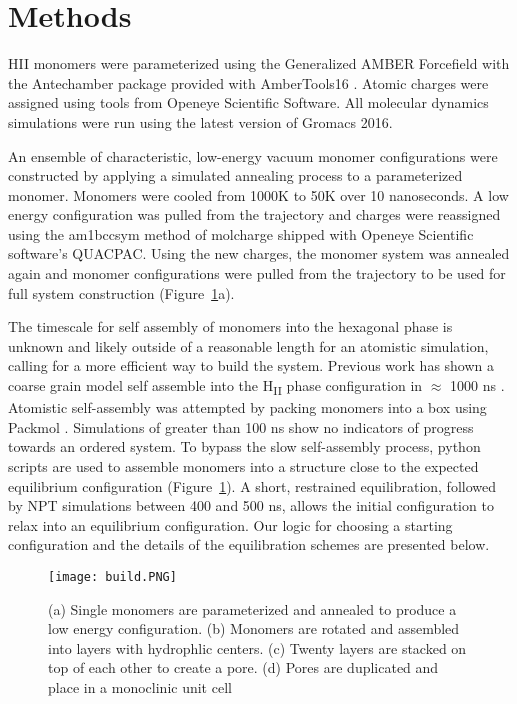 \section*{Methods}
	
HII monomers were parameterized using the Generalized AMBER Forcefield
\cite{wang_development_2004} with the Antechamber package \cite{wang_automatic_2006}
provided with AmberTools16 \cite{case_ambertools16_2016}. Atomic charges were
assigned using tools from Openeye Scientific Software. All molecular 
dynamics simulations were run using the latest version of Gromacs 2016. \cite{bekker_gromacs:_1993,berendsen_gromacs:_1995,
van_der_spoel_gromacs:_2005,hess_gromacs_2008}
	
An ensemble of characteristic, low-energy vacuum monomer configurations
were constructed by applying a simulated annealing process to a
parameterized monomer. Monomers were cooled from 1000K to 50K over 10
nanoseconds. A low energy configuration was pulled from the trajectory 
and charges were reassigned using the am1bccsym method of molcharge
shipped with Openeye Scientific software's QUACPAC. Using the new
charges, the monomer system was annealed again and monomer
configurations were pulled from the trajectory to be used for full
system construction (Figure~\ref{fig:python}a).
	
The timescale for self assembly of monomers into the hexagonal phase is
unknown and likely outside of a reasonable length for an atomistic
simulation, calling for a more efficient way to build the system. 
Previous work has shown a coarse grain model self assemble into the H\textsubscript{II}
phase configuration in $\approx$ 1000 ns \cite{mondal_self-assembly_2013}.
Atomistic self-assembly was attempted by packing monomers into a box 
using Packmol \cite{martinez_packmol:_2009}. Simulations of greater than 100 ns 
show no indicators of progress towards an ordered system. To bypass the
slow self-assembly process, python scripts are used to assemble 
monomers into a structure close to the expected equilibrium configuration (Figure~\ref{fig:python}).
A short, restrained equilibration, followed by NPT simulations between 400 and 500 ns, 
allows the initial configuration to relax into an equilibrium configuration.
Our logic for choosing a starting configuration and the details of the equilibration 
schemes are presented below. %

\begin{figure}
	\centering
	\texttt{[image: build.PNG]}
	\caption{(a) Single monomers are parameterized and annealed to produce a low energy
		configuration. (b) Monomers are rotated and assembled into layers with 
		hydrophlic centers. (c) Twenty layers are stacked on top of each other to create
		a pore. (d) Pores are duplicated and place in a monoclinic unit cell}\label{fig:python}
\end{figure}

